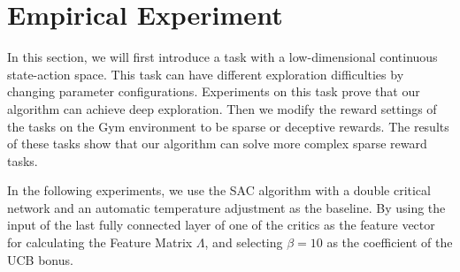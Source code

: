 \section{Empirical Experiment}

In this section, we will first introduce a task with a low-dimensional continuous state-action space. This task can have different exploration difficulties by changing parameter configurations. Experiments on this task prove that our algorithm can achieve deep exploration. Then we modify the reward settings of the tasks on the Gym environment to be sparse or deceptive rewards. The results of these tasks show that our algorithm can solve more complex sparse reward tasks.

In the following experiments, we use the SAC algorithm with a double critical network and an automatic temperature adjustment as the baseline. By using the input of the last fully connected layer of one of the critics as the feature vector for calculating the Feature Matrix $\Lambda$, and selecting $ \beta = 10 $ as the coefficient of the UCB bonus. 

